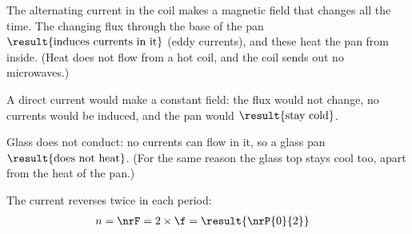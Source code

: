 \begin{abcliste}
\abc The alternating current in the coil makes a magnetic field that changes all the time. The changing flux through the base of the pan $\result{\text{induces currents in it}}$ (eddy currents), and these heat the pan from inside. (Heat does not flow from a hot coil, and the coil sends out no microwaves.)

\abc A direct current would make a constant field: the flux would not change, no currents would be induced, and the pan would $\result{\text{stay cold}}$.

\abc Glass does not conduct: no currents can flow in it, so a glass pan $\result{\text{does not heat}}$. (For the same reason the glass top stays cool too, apart from the heat of the pan.)

\abc The current reverses twice in each period:
\begin{align}
 n &= \nrF = 2\times\f = \result{\nrP{0}{2}}
\end{align}
\end{abcliste}
